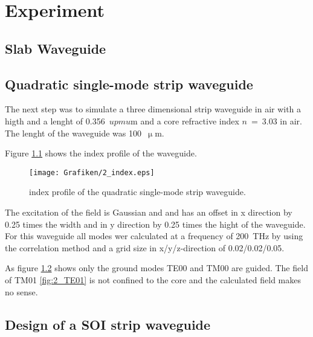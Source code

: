 \chapter{Experiment}
\section{Slab Waveguide}



\section{Quadratic single-mode strip waveguide}
The next step was to simulate a three dimensional strip waveguide in air with a higth and a lenght of 0.356~$upmu$m and a core refractive index $n$~=~3.03 in air.
The lenght of the waveguide was 100~$\upmu$m.

Figure \ref{fig:2_index} shows the index profile of the waveguide.

\begin{figure}%
\texttt{[image: Grafiken/2\_index.eps]}%
\caption{index profile of the quadratic single-mode strip waveguide.}%
\label{fig:2_index}%
\end{figure}

The excitation of the field is Gaussian and and has an offset in x direction by 0.25 times the width and in y direction by 0.25 times the hight of the waveguide.
For this waveguide all modes wer calculated at a frequency of 200~THz by using the correlation method and a grid size in x/y/z-direction of 0.02/0.02/0.05. 



\begin{figure}%
\centering
\caption{}%
\label{fig:2_modes}%
\end{figure}
As figure \ref{fig:2_modes} shows only the ground modes TE00 and TM00 are guided. The field of TM01 \ref{fig:2_TE01} is not confined to the core and the calculated field makes no sense.




\section{Design of a SOI strip waveguide}